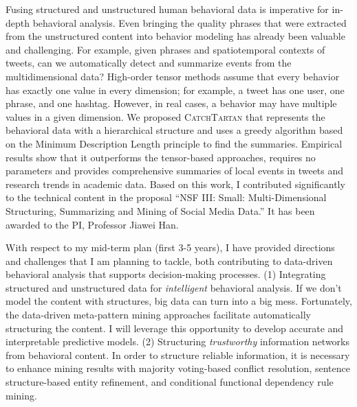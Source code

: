 \documentclass[10.5pt]{article}
\begin{document}
Fusing structured and unstructured human behavioral data is imperative for in-depth behavioral analysis. Even bringing the quality phrases that were extracted from the unstructured content into behavior modeling has already been valuable and challenging. For example, given phrases and spatiotemporal contexts of tweets, can we automatically detect and summarize events from the multidimensional data? High-order tensor methods assume that every behavior has exactly one value in every dimension; for example, a tweet has one user, one phrase, and one hashtag. However, in real cases, a behavior may have multiple values in a given dimension. We proposed \textsc{CatchTartan} \cite{jiang2016catchtartan} that represents the behavioral data with a hierarchical structure and uses a greedy algorithm based on the Minimum Description Length principle to find the summaries.
Empirical results show that it outperforms the tensor-based approaches, requires no parameters and provides comprehensive summaries of local events in tweets and research trends in academic data.
Based on this work, I contributed significantly to the technical content in the proposal ``NSF III: Small: Multi-Dimensional Structuring, Summarizing and Mining of Social Media Data.'' It has been awarded to the PI, Professor Jiawei Han. %

\vskip 0.05in
\vskip 0.01in



With respect to my mid-term plan (first 3-5 years), I have provided directions and challenges that I am planning to tackle, both contributing to data-driven behavioral analysis that supports decision-making processes.
(1) Integrating structured and unstructured data for \emph{intelligent} behavioral analysis.
If we don't model the content with structures, big data can turn into a big mess. Fortunately, the data-driven meta-pattern mining approaches facilitate automatically structuring the content. I will leverage this opportunity to develop accurate and interpretable predictive models.
(2) Structuring \emph{trustworthy} information networks from behavioral content.
In order to structure reliable information, it is necessary to enhance mining results with majority voting-based conflict resolution, sentence structure-based entity refinement, and conditional functional dependency rule mining.
\end{document}
